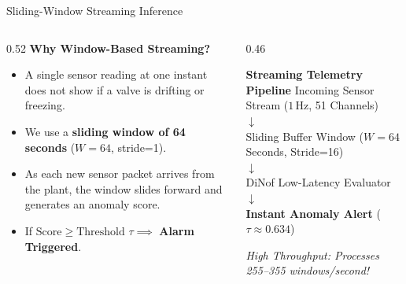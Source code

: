 \documentclass[aspectratio=169, 11pt]{beamer}
\begin{document}
\begin{frame}{Sliding-Window Streaming Inference}
\begin{columns}[T]
  \begin{column}{0.52\textwidth}
    \textbf{\large Why Window-Based Streaming?}
    \begin{itemize}\itemsep=5pt
      \item A single sensor reading at one instant does not show if a valve is drifting or freezing.
      \item We use a \textbf{sliding window of 64 seconds} ($W=64$, stride=1).
      \item As each new sensor packet arrives from the plant, the window slides forward and generates an anomaly score.
      \item If $\text{Score} \ge \text{Threshold } \tau \implies$ \textbf{Alarm Triggered}.
    \end{itemize}
  \end{column}

  \begin{column}{0.46\textwidth}
    \begin{block}{\centering \textbf{Streaming Telemetry Pipeline}}
      \centering \small
      Incoming Sensor Stream ($1$\,Hz, 51 Channels) \\
      $\downarrow$ \\
      Sliding Buffer Window ($W=64$ Seconds, Stride=16) \\
      $\downarrow$ \\
      DiNof Low-Latency Evaluator \\
      $\downarrow$ \\
      \textbf{Instant Anomaly Alert} ($\tau \approx 0.634$)
    \end{block}
    \vspace{4pt}
    \centering \footnotesize \textit{High Throughput: Processes 255--355 windows/second!}
  \end{column}
\end{columns}
\end{frame}
\end{document}
